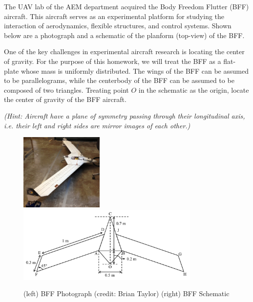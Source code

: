
The UAV lab of the AEM department acquired the Body Freedom Flutter (BFF) aircraft. This aircraft
serves as an experimental platform for studying the interaction of aerodynamics, flexible
structures, and control systems. Shown below are a photograph and a schematic of the planform
(top-view) of the BFF.

One of the key challenges in experimental aircraft research is locating the center of gravity.
For the purpose of this homework, we will treat the BFF as a flat-plate whose mass is uniformly
distributed. The wings of the BFF can be assumed to be parallelograms, while the centerbody
of the BFF can be assumed to be composed of two triangles.  Treating point $O$ in the schematic
as the origin, locate the center of gravity of the BFF aircraft.

\textit{(Hint: Aircraft have a plane of symmetry passing through their longitudinal axis, i.e. their left and
right sides are mirror images of each other.)}


\begin{figure}[ht!]
  \centering
  \includegraphics[height=1.5in]{figa.png}
  \includegraphics[height=1.5in]{figb.png}
  \caption*{(left) BFF Photograph (credit: Brian Taylor) (right) BFF Schematic}
\end{figure}

